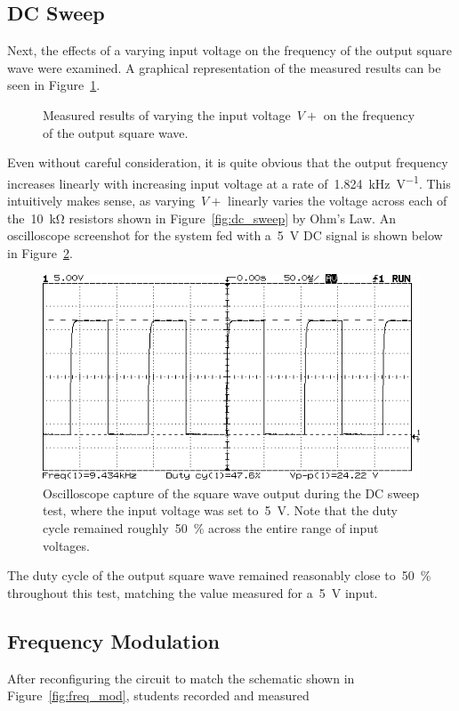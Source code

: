 \subsection{DC Sweep}
Next, the effects of a varying input voltage on the frequency of the output
square wave were examined.  A graphical representation of the measured results
can be seen in Figure~\ref{fig:dc_sweep_plot}.
%
\begin{figure}[H]
	\centering
	
	\parbox{.6\textwidth}{
	\caption[DC Sweep Results]{Measured results of varying the input
	voltage~$V+$ on the frequency of the output square wave.}
	\label{fig:dc_sweep_plot}}
\end{figure}
%
Even without careful consideration, it is quite obvious that the output
frequency increases linearly with increasing input voltage at a rate
of~\SI{1.824}{\kilo\hertz\per\volt}.  This intuitively makes sense, as
varying~$V+$ linearly varies the voltage across each of the~\SI{10}{\kilo\ohm}
resistors shown in Figure~\ref{fig:dc_sweep} by Ohm's Law.  An oscilloscope
screenshot for the system fed with a~\SI{5}{\volt} DC signal is shown below in
Figure~\ref{fig:shot5}.
%
\begin{figure}[H]
	\centering
	\includegraphics[width=.6\textwidth]{img/shot/shot5.png}
	\parbox{.6\textwidth}{
	\caption[DC Sweep at \SI{5}{\volt}]{Oscilloscope capture of the square wave
	output during the DC sweep test, where the input voltage was set
	to~\SI{5}{\volt}.  Note that the duty cycle remained
	roughly~\SI{50}{\percent} across the entire range of input voltages.}
	\label{fig:shot5}}
\end{figure}
%
The duty cycle of the output square wave remained reasonably close
to~\SI{50}{\percent} throughout this test, matching the value measured for
a~\SI{5}{\volt} input.

\subsection{Frequency Modulation}
After reconfiguring the circuit to match the schematic shown in Figure~\ref{fig:freq_mod}, students recorded and measured
\begin{figure}[H]
	\centering
	
\end{figure}
